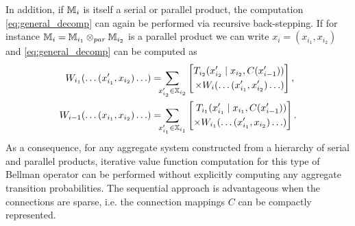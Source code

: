 \documentclass[conference]{IEEEtran}
\begin{document}
In addition, if $\mathbb{M}_{i}$ is itself a serial or parallel product, the computation \eqref{eq:general_decomp} can again be performed via recursive back-stepping. If for instance $\mathbb{M}_{i} = \mathbb{M}_{i_1} \otimes_{par} \mathbb{M}_{i_2}$ is a parallel product we can write $x_i = (x_{i_1}, x_{i_2})$ and \eqref{eq:general_decomp} can be computed as
\begin{equation*}
\begin{aligned}
  W_{i_1}(\ldots (x_{i_1}', x_{i_2}) \ldots) & = \hspace{-2mm} \sum_{x_{i_2}'  \in \X_{i_2}} \left[ \begin{aligned} T_{i_2}(x_{i_2}' \mid x_{i_2}, C(x_{i-1}') ) \\ \times W_i(\ldots (x_{i_1}', x_{i_2}') \ldots) \end{aligned} \right], \\
  W_{i-1}(\ldots (x_{i_1}, x_{i_2}) \ldots)  & =  \hspace{-2mm} \sum_{x_{i_1}' \in \X_{i_1}} \left[ \begin{aligned} T_{i_1}(x_{i_1}' \mid x_{i_1}, C(x_{i-1}') ) \\
  	\times W_{i_1}(\ldots (x_{i_1}', x_{i_2}) \ldots)	
  \end{aligned} \right].
\end{aligned}
\end{equation*}
As a consequence, for any aggregate system constructed from a hierarchy of serial and parallel products, iterative value function computation for this type of Bellman operator can be performed without explicitly computing any aggregate transition probabilities. The sequential approach is advantageous when the connections are sparse, i.e. the connection mappings $C$ can be compactly represented.
\end{document}

